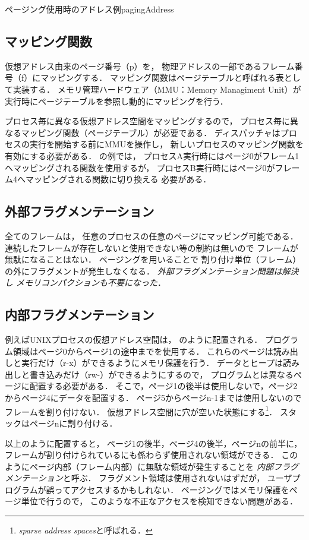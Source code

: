 {ページング使用時のアドレス例}{pagingAddress}

\subsection{マッピング関数}
仮想アドレス由来のページ番号（p）を，
物理アドレスの一部であるフレーム番号（f）にマッピングする．
マッピング関数はページテーブルと呼ばれる表として実装する．
メモリ管理ハードウェア（MMU：Memory Managiment Unit）が
実行時にページテーブルを参照し動的にマッピングを行う．

プロセス毎に異なる仮想アドレス空間をマッピングするので，
プロセス毎に異なるマッピング関数（ページテーブル）が必要である．
ディスパッチャはプロセスの実行を開始する前にMMUを操作し，
新しいプロセスのマッピング関数を有効にする必要がある．
の例では，
プロセスA実行時にはページ0がフレーム1へマッピングされる関数を使用するが，
プロセスB実行時にはページ0がフレーム4へマッピングされる関数に切り換える
必要がある．

\subsection{外部フラグメンテーション}
全てのフレームは，
任意のプロセスの任意のページにマッピング可能である．
連続したフレームが存在しないと使用できない等の制約は無いので
フレームが無駄になることはない．
ページングを用いることで
割り付け単位（フレーム）の外にフラグメントが発生しなくなる．
\emph{外部フラグメンテーション問題は解決し
メモリコンパクションも不要になった}．

\subsection{内部フラグメンテーション}
例えばUNIXプロセスの仮想アドレス空間は，
のように配置される．
プログラム領域はページ0からページ1の途中までを使用する．
これらのページは読み出しと実行だけ（r-x）ができるようにメモリ保護を行う．
データとヒープは読み出しと書き込みだけ（rw-）ができるようにするので，
プログラムとは異なるページに配置する必要がある．
そこで，ページ1の後半は使用しないで，ページ2からページ4にデータを配置する．
ページ5からページn-1までは使用しないのでフレームを割り付けない．
仮想アドレス空間に穴が空いた状態にする\footnote{
\emph{sparse address spaces}と呼ばれる．}．
スタックはページnに割り付ける．

以上のように配置すると，
ページ1の後半，ページ4の後半，ページnの前半に，
フレームが割り付けられているにも係わらず使用されない領域ができる．
このようにページ内部（フレーム内部）に無駄な領域が発生することを
\emph{内部フラグメンテーション}と呼ぶ．
フラグメント領域は使用されないはずだが，
ユーザプログラムが誤ってアクセスするかもしれない．
ページングではメモリ保護をページ単位で行うので，
このような不正なアクセスを検知できない問題がある．

